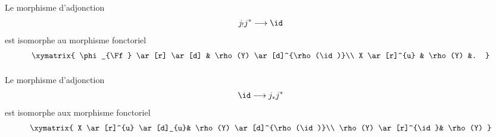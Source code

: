 \paragraph{}
Le morphisme d'adjonction
$$
j_{!}j^{\ast}\longrightarrow \id
$$
est isomorphe au morphisme fonctoriel
\[
\xymatrix{
\phi_{\Ff} \ar[r] \ar[d] & \rho(Y) \ar[d]^{\rho(\id)}\\
X \ar[r]^{u}                 & \rho(Y)     &. }
\]

\paragraph{}
Le morphisme d'adjonction
$$
\id\longrightarrow j_\ast j^{\ast}
$$
est isomorphe aux morphisme fonctoriel
\[
\xymatrix{
X  \ar[r]^{u} \ar[d]_{u}& \rho(Y) \ar[d]^{\rho(\id)}\\
\rho(Y) \ar[r]^{\id}& \rho(Y) }
\]
